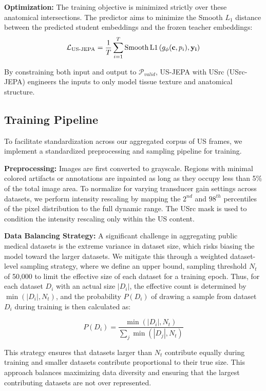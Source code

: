 \documentclass{article}
\theoremstyle{plain}
\theoremstyle{definition}
\theoremstyle{remark}
\begin{document}
\textbf{Optimization:} 
The training objective is minimized strictly over these anatomical intersections. The predictor aims to minimize the Smooth $L_1$ distance between the predicted student embeddings and the frozen teacher embeddings:
\begin{equation}
    \mathcal{L}_{\text{US-JEPA}} = \frac{1}{T} \sum_{i=1}^{T} \text{Smooth\,L1}\left( g_\phi(\mathbf{c}, p_{i}), \mathbf{y_i} \right)
\end{equation}

By constraining both input and output to $\mathcal{P}_{valid}$, US-JEPA with USrc (USrc-JEPA) engineers the inputs to only model tissue texture and anatomical structure.

\subsection{Training Pipeline}

To facilitate standardization across our aggregated corpus of US frames, we implement a standardized preprocessing and sampling pipeline for training.

\textbf{Preprocessing:} Images are first converted to grayscale. Regions with minimal colored artifacts or annotations are inpainted as long as they occupy less than 5\% of the total image area. To normalize for varying transducer gain settings across datasets, we perform intensity rescaling by mapping the $2^{nd}$ and $98^{th}$ percentiles of the pixel distribution to the full dynamic range. The USrc mask is used to condition the intensity rescaling only within the US content.

\textbf{Data Balancing Strategy:} A significant challenge in aggregating public medical datasets is the extreme variance in dataset size, which risks biasing the model toward the larger datasets. We mitigate this through a weighted dataset-level sampling strategy, where we define an upper bound, sampling threshold $N_{t}$ of 50,000 to limit the effective size of each dataset for a training epoch. Thus, for each dataset $D_i$ with an actual size $|D_i|$, the effective count is determined by $\min(|D_i|, N_{t})$, and the probability $P(D_i)$ of drawing a sample from dataset $D_i$ during training is then calculated as:

\begin{equation}
    P(D_i) = \frac{\min(|D_i|, N_{t})}{\sum_{j} \min(|D_j|, N_{t})}
\end{equation}

This strategy ensures that datasets larger than $N_{t}$ contribute equally during training and smaller datasets contribute proportional to their true size. This approach balances maximizing data diversity and ensuring that the largest contributing datasets are not over represented.
\end{document}

